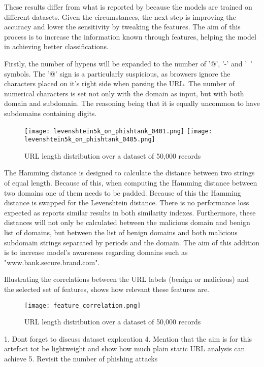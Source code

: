 	These results differ from what is reported by \cite{SVM_SIMILARITY_INDEX} because the models are trained on different datasets. Given the circumstances, the next step is improving the accuracy and lower the sensitivity by tweaking the features. The aim of this process is to increase the information known through features, helping the model in achieving better classifications.

	Firstly, the number of hypens will be expanded to the number of '@', '-' and '~' symbols. The '@' sign is a particularly suspicious, as browsers ignore the characters placed on it's right side when parsing the URL. The number of numerical characters is set not only with the domain as input, but with both domain and subdomain. The reasoning being that it is equally uncommon to have subdomains containing digits.

	\begin{figure}[t]
		\centering
		\texttt{[image: levenshtein5k\_on\_phishtank\_0401.png]}	\texttt{[image: levenshtein5k\_on\_phishtank\_0405.png]}
		\caption{URL length distribution over a dataset of 50,000 records}
		\label{fig:HAMMING_ON_MIXED}
	\end{figure}

	The Hamming distance is designed to calculate the distance between two strings of equal length. Because of this, when computing the Hamming distance between two domains one of them needs to be padded. Because of this the Hamming distance is swapped for the Levenshtein distance. There is no performance loss expected as \cite{SVM_SIMILARITY_INDEX} reports similar results in both similarity indexes. Furthermore, these distances will not only be calculated between the malicious domain and benign list of domains, but between the list of benign domains and both malicious subdomain strings separated by periods and the domain. The aim of this addition is to increase model's awareness regarding domains such as "www.bank.secure.brand.com".

	Illustrating the correlations between the URL labels (benign or malicious) and the selected set of features, shows how relevant these features are.

	\begin{figure}[b]
		\centering
		\texttt{[image: feature\_correlation.png]}
		\caption{URL length distribution over a dataset of 50,000 records}
		\label{fig:FEATURE_CORRELATION}
	\end{figure}





	1. Dont forget to discuss dataset exploration
	4. Mention that the aim is for this artefact tot be lightweight and show how much plain static URL analysis can achieve
	5. Revisit the number of phishing attacks

\fi